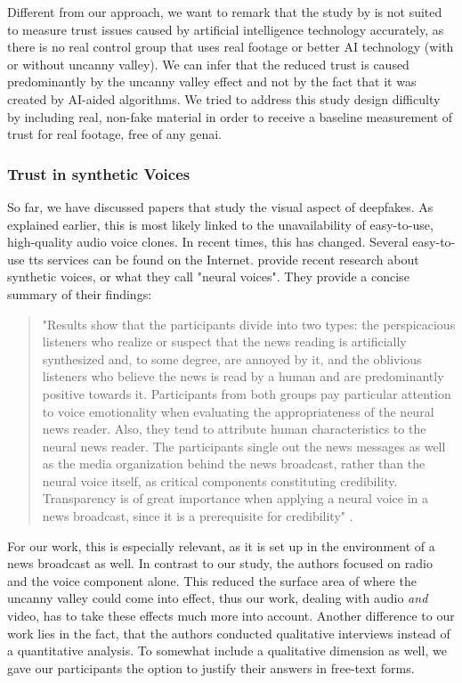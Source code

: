 \documentclass[
  a4paper,  %
  twoside,  %
  bibliography=totoc,
  headsepline,
  cleardoublepage=empty,
  parskip=half,
  draft=false
]{scrbook}
\begin{document}
Different from our approach, we want to remark that the study by  is not suited to measure trust issues caused by artificial intelligence technology accurately, as there is no real control group that uses real footage or better AI technology (with or without uncanny valley). We can infer that the reduced trust is caused predominantly by the uncanny valley effect and not by the fact that it was created by AI-aided algorithms. We tried to address this study design difficulty by including real, non-fake material in order to receive a baseline measurement of trust for real footage, free of any \gls{genai}.

\subsubsection*{Trust in synthetic Voices}
So far, we have discussed papers that study the visual aspect of deepfakes. As explained earlier, this is most likely linked to the unavailability of easy-to-use, high-quality audio voice clones. In recent times, this has changed. Several easy-to-use \gls{tts} services can be found on the Internet.  provide recent research about synthetic voices, or what they call "neural voices". They provide a concise summary of their findings: 

\begin{quotation}
"Results show that the participants divide into two types: the perspicacious listeners who realize or suspect that the news reading is artificially synthesized and, to some degree, are annoyed by it, and the oblivious listeners who believe the news is read by a human and are predominantly positive towards it. Participants from both groups pay particular attention to voice emotionality when evaluating the appropriateness of the neural news reader. Also, they tend to attribute human characteristics to the neural news reader. The participants single out the news messages as well as the media organization behind the news broadcast, rather than the neural voice itself, as critical components constituting credibility. Transparency is of great importance when applying a neural voice in a news broadcast, since it is a prerequisite for credibility" \cite{heiselbergAutomatedNewsReading2022}.
\end{quotation} 

For our work, this is especially relevant, as it is set up in the environment of a news broadcast as well. In contrast to our study, the authors focused on radio and the voice component alone. This reduced the surface area of where the uncanny valley could come into effect, thus our work, dealing with audio \textit{and} video, has to take these effects much more into account. Another difference to our work lies in the fact, that the authors conducted qualitative interviews instead of a quantitative analysis. To somewhat include a qualitative dimension as well, we gave our participants the option to justify their answers in free-text forms. 
\end{document}
